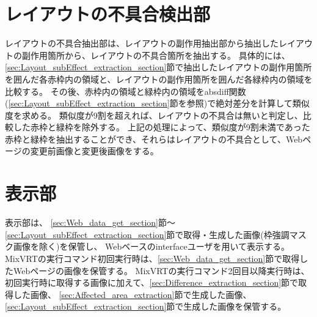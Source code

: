 \section{レイアウトの不具合検出部}\label{sec:Layout_bug_extraction_section}
レイアウトの不具合抽出部は、レイアウトの副作用抽出部から抽出したレイアウトの副作用箇所から、レイアウトの不具合箇所を抽出する。
具体的には、\ref{sec:Layout_subEffect_extraction_section}節で抽出したレイアウトの副作用箇所を囲んだ各赤枠内の領域と、レイアウトの副作用箇所を囲んだ各緑枠内の領域を比較する。
その後、赤枠内の領域と緑枠内の領域をabsdiff関数(\ref{sec:Layout_subEffect_extraction_section}節を参照)で絶対差分を計算して類似度を求める。
類似度が9割を超えれば、レイアウトの不具合は無いと判定し、比較した赤枠と緑枠を除外する。
上記の処理によって、類似度が9割未満であった赤枠と緑枠を抽出することができ、それらはレイアウトの不具合として、Webページの変更前画像と変更後画像をする。


\section{表示部}\label{sec:Interface_Display_Section}
表示部は、
\ref{sec:Web_data_get_section}節～\ref{sec:Layout_subEffect_extraction_section}節で取得・生成した画像(枠強調マスク画像を除く)を保管し、
Webベースのinterfaceユーザを用いて表示する。
MixVRTの実行コマンド初回実行時は、\ref{sec:Web_data_get_section}節で取得したWebページの画像を保管する。
MixVRTの実行コマンド2回目以降実行時は、初回実行時に取得する画像に加えて、\ref{sec:Difference_extraction_section}節で取得した画像、
\ref{sec:Affected_area_extraction}節で生成した画像、\ref{sec:Layout_subEffect_extraction_section}節で生成した画像を保管する。








